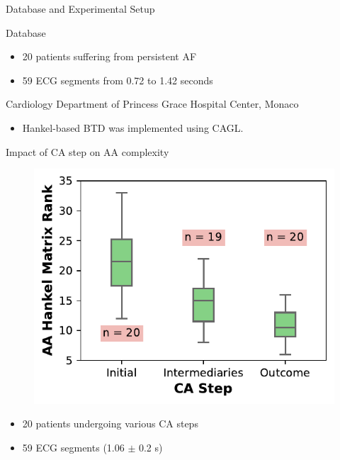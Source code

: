 \documentclass{beamer}
\begin{document}
	\begin{frame}{Database and Experimental Setup} 
			
		\begin{block}{Database}
			\begin{itemize}
				\item 20 patients suffering from persistent AF
				\item 59 ECG segments from 0.72 to 1.42 seconds
			\end{itemize}
			
			\begin{center}
				Cardiology Department of Princess Grace Hospital Center, Monaco
			\end{center}					
		\end{block}	
		
		\begin{itemize}
			\item Hankel-based BTD was implemented using CAGL.
		\end{itemize}
	\end{frame}

	\begin{frame}{Impact of CA step on AA complexity}
		
		\vspace{-0.5cm}
		\begin{figure}[h]
			\centering
			\includegraphics[scale=0.9]{fig/CinC2020/boxplot_complexity.pdf}
		\end{figure}
		\vspace{-0.5cm}
		\begin{itemize}
			\item 20 patients undergoing various CA steps
			\item 59 ECG segments (1.06 $\pm$ 0.2 s)
		\end{itemize}
	\end{frame}
\end{document}
